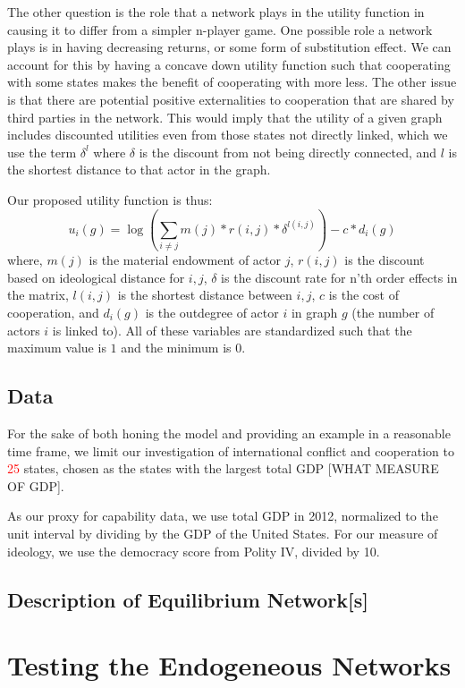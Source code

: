 \documentclass[12pt,onesided,fullpage]{amsart}
\begin{document}
The other question is the role that a network plays in the utility function in causing it to differ from a simpler n-player game. One possible role a network plays is in having decreasing returns, or some form of substitution effect. We can account for this by having a concave down utility function such that cooperating with some states makes the benefit of cooperating with more less. The other issue is that there are potential positive externalities to cooperation that are shared by third parties in the network. This would imply that the utility of a given graph includes discounted utilities even from those states not directly linked, which we use the term $\delta^{l}$ where $\delta$ is the discount from not being directly connected, and $l$ is the shortest distance to that actor in the graph.

Our proposed utility function is thus:
\begin{equation}
u_{i}(g) = \log (\sum_{i \neq j}  m(j)*r(i,j)*\delta^{l(i,j)}) - c*d_{i}(g)
\end{equation}
where, $m(j)$ is the material endowment of actor $j$, $r(i,j)$ is the discount based on ideological distance for $i, j$, $\delta$ is the discount rate for n'th order effects in the matrix, $l(i,j)$ is the shortest distance between $i, j$, $c$ is the cost of cooperation, and $d_{i}(g)$ is the outdegree of actor $i$ in graph $g$ (the number of actors $i$ is linked to). All of these variables are standardized such that the maximum value is $1$ and the minimum is $0$.

\subsection{Data}
For the sake of both honing the model and providing an example in a reasonable time frame, we limit our investigation of international conflict and cooperation to \textcolor{red}{25} states, chosen as the states with the largest total GDP [WHAT MEASURE OF GDP]. 

As our proxy for capability data, we use total GDP in 2012, normalized to the unit interval by dividing by the GDP of the United States. For our measure of ideology, we use the democracy score from Polity IV, divided by 10.
\subsection{Description of Equilibrium Network[s]}


\section{Testing the Endogeneous Networks}
\end{document}

